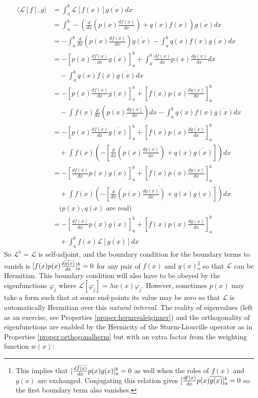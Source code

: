 \begin{align*}
\langle \mathcal{L}[f], g \rangle &= \int_a^b \mathcal{L}[f(x)] \overline{g(x)} dx \\
&= \int_a^b -\left(\frac{d}{dx} (p(x) \frac{df(x)}{dx}) + q(x)f(x)\right)  \overline{g(x)} dx \\
&= -\int_a^b \frac{d}{dx} (p(x) \frac{d f(x)}{dx}) \overline{g(x)} - \int_a^b q(x)f(x)\overline{g(x)} dx \\
&= -[p(x) \frac{df(x)}{dx} \overline{g(x)}]_a^b + \int_a^b \frac{df(x)}{dx} p(x) \frac{d\overline{g(x)}}{dx} dx \\
&\quad - \int_a^b q(x)f(x)\overline{g(x)} dx\\
&= -[p(x) \frac{df(x)}{dx} \overline{g(x)}]_a^b + [f(x) p(x) \frac{d\overline{g(x)}}{dx}]_a^b  \\
&\quad -\int f(x)\frac{d}{dx}(p(x) \frac{d\overline{g(x)}}{dx}) dx - \int_a^b q(x)f(x)\overline{g(x)} dx \\
&= -[p(x) \frac{df(x)}{dx} \overline{g(x)}]_a^b + [f(x) p(x) \frac{d\overline{g(x)}}{dx}]_a^b  \\
&\quad + \int f(x) \left(-[\frac{d}{dx}(p(x) \frac{d\overline{g(x)}}{dx}) + q(x)\overline{g(x)}]\right) dx \\
&= -[\frac{df(x)}{dx} p(x) \overline{g(x)}]_a^b + [f(x) p(x) \frac{d\overline{g(x)}}{dx}]_a^b \\
&\quad + \int f(x) \overline{\left(-[\frac{d}{dx}(p(x) \frac{d g(x)}{dx}) + q(x)g(x)]\right)} dx \\
&\quad \text{($p(x), q(x)$ are real)} \\
&= -[\frac{df(x)}{dx} p(x) \overline{g(x)}]_a^b + [f(x) p(x) \frac{d\overline{g(x)}}{dx}]_a^b \\
&\quad + \int_a^b f(x) \overline{\mathcal{L}[g(x)]} dx
\end{align*}
So $\mathcal{L}^\dag = \mathcal{L}$ is self-adjoint, and the boundary condition for the boundary terms to vanish is $\smash{[f(x) p(x) \frac{d\overline{g(x)}}{dx}]_a^b} = 0$ for any pair of $f(x)$ and $g(x)$\footnote{This implies that $\smash{[\frac{d\overline{f(x)}}{dx} p(x) g(x)]_a^b} = 0$ as well when the roles of $f(x)$ and $g(x)$ are exchanged. Conjugating this relation gives $\smash{[\frac{df(x)}{dx} p(x) \overline{g(x)}]_a^b} = 0$ so the first boundary term also vanishes.} so that $\mathcal{L}$ can be Hermitian. This boundary condition will also have to be obeyed by the eigenfunctions $\varphi_j$ where $\mathcal{L}[\varphi_j] = \lambda w(x)\varphi_j$. However, sometimes $p(x)$ may take a form such that at some end-points its value may be zero so that $\mathcal{L}$ is automatically Hermitian over this \textit{natural interval}. The reality of eigenvalues (left as an exercise, see Properties \ref{proper:hermrealeiginner}) and the orthogonality of eigenfunctions are enabled by the Hermicity of the Sturm-Liouville operator as in Properties \ref{proper:orthogonalherm} but with an extra factor from the weighting function $w(x)$:
